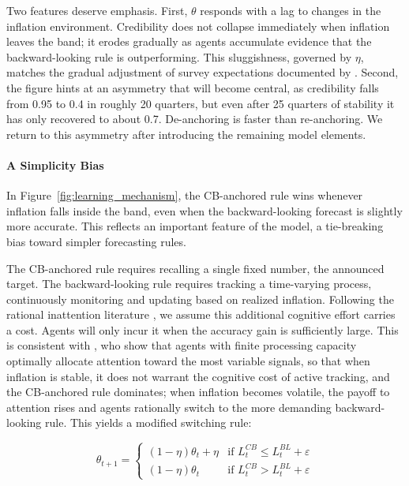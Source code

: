 \documentclass[10pt]{article}
\begin{document}
Two features deserve emphasis. First, $\theta$ responds with a lag to changes in the inflation environment. Credibility does not collapse immediately when inflation leaves the band; it erodes gradually as agents accumulate evidence that the backward-looking rule is outperforming. This sluggishness, governed by $\eta$, matches the gradual adjustment of survey expectations documented by \citet{coibion2015information}. Second, the figure hints at an asymmetry that will become central, as credibility falls from 0.95 to 0.4 in roughly 20 quarters, but even after 25 quarters of stability it has only recovered to about 0.7. De-anchoring is faster than re-anchoring. We return to this asymmetry after introducing the remaining model elements.

\paragraph{A Simplicity Bias}

In Figure~\ref{fig:learning_mechanism}, the CB-anchored rule wins whenever inflation falls inside the band, even when the backward-looking forecast is slightly more accurate. This reflects an important feature of the model, a tie-breaking bias toward simpler forecasting rules.

The CB-anchored rule requires recalling a single fixed number, the announced target. The backward-looking rule requires tracking a time-varying process, continuously monitoring and updating based on realized inflation. Following the rational inattention literature \citep{sims2003implications}, we assume this additional cognitive effort carries a cost. Agents will only incur it when the accuracy gain is sufficiently large. This is consistent with \citet{mackowiak2009optimal}, who show that agents with finite processing capacity optimally allocate attention toward the most variable signals, so that when inflation is stable, it does not warrant the cognitive cost of active tracking, and the CB-anchored rule dominates; when inflation becomes volatile, the payoff to attention rises and agents rationally switch to the more demanding backward-looking rule. This yields a modified switching rule:
  
\begin{equation}
\label{eq:switching_rule}
\theta_{t+1} =
\begin{cases}
(1-\eta)\theta_t + \eta & \text{if } L^{CB}_t \leq L^{BL}_t + \varepsilon\\
(1-\eta)\theta_t & \text{if } L^{CB}_t > L^{BL}_t + \varepsilon
\end{cases}
\end{equation}
\end{document}
